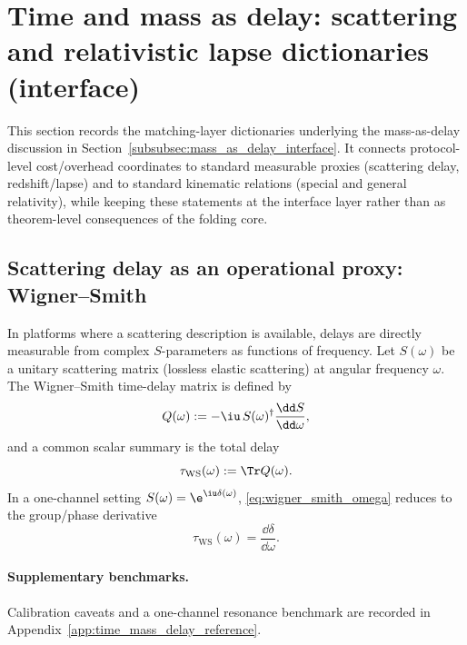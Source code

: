 \section{Time and mass as delay: scattering and relativistic lapse dictionaries (interface)}
\label{app:time_mass_delay}

This section records the matching-layer dictionaries underlying the mass-as-delay discussion in Section~\ref{subsubsec:mass_as_delay_interface}.
It connects protocol-level cost/overhead coordinates to standard measurable proxies (scattering delay, redshift/lapse) and to standard kinematic relations (special and general relativity), while keeping these statements at the interface layer rather than as theorem-level consequences of the folding core.

\subsection{Scattering delay as an operational proxy: Wigner--Smith}
\label{app:wigner_smith_delay_z128}

In platforms where a scattering description is available, delays are directly measurable from complex $S$-parameters as functions of frequency.
Let $S(\omega)$ be a unitary scattering matrix (lossless elastic scattering) at angular frequency $\omega$.
The Wigner--Smith time-delay matrix is defined by \cite{Wigner1955,Smith1960}
\begin{equation}
\label{eq:wigner_smith_omega}
Q(\omega):=-\iu\,S(\omega)^\dagger\frac{\dd S}{\dd \omega},
\end{equation}
and a common scalar summary is the total delay
\begin{equation}
\label{eq:tau_ws_trace_omega}
\tau_{\mathrm{WS}}(\omega):=\Tr Q(\omega).
\end{equation}
In a one-channel setting $S(\omega)=\e^{\iu\delta(\omega)}$, \eqref{eq:wigner_smith_omega} reduces to the group/phase derivative
\begin{equation}
\label{eq:wigner_smith_one_channel}
\tau_{\mathrm{WS}}(\omega)=\frac{\dd\delta}{\dd\omega}.
\end{equation}

\paragraph{Supplementary benchmarks.}
Calibration caveats and a one-channel resonance benchmark are recorded in Appendix~\ref{app:time_mass_delay_reference}.

